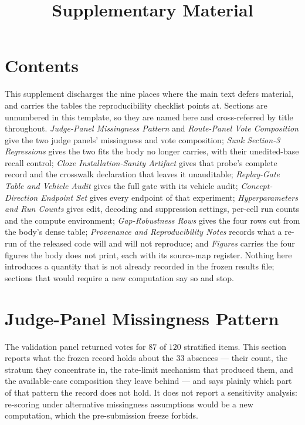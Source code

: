 \documentclass[letterpaper]{article}
\title{Supplementary Material}
\author{}
\begin{document}
\maketitle

\section*{Contents}
This supplement discharges the nine places where the main text defers material,
and carries the tables the reproducibility checklist points at.  Sections are
unnumbered in this template, so they are named here and cross-referred by title
throughout.  \emph{Judge-Panel Missingness Pattern} and \emph{Route-Panel Vote
Composition} give the two judge panels' missingness and vote composition;
\emph{Sunk Section-3 Regressions} gives the two fits the body no longer carries,
with their unedited-base recall control; \emph{Cloze Installation-Sanity
Artifact} gives that probe's complete record and the crosswalk declaration that
leaves it unauditable; \emph{Replay-Gate Table and Vehicle Audit} gives the full
gate with its vehicle audit; \emph{Concept-Direction Endpoint Set} gives every
endpoint of that experiment; \emph{Hyperparameters and Run Counts} gives edit,
decoding and suppression settings, per-cell run counts and the compute
environment; \emph{Gap-Robustness Rows} gives the four rows cut from the body's
dense table; \emph{Provenance and Reproducibility Notes} records what a re-run of
the released code will and will not reproduce; and \emph{Figures} carries the
four figures the body does not print, each with its source-map register.
Nothing here introduces a quantity that is not already recorded in the frozen
results file; sections that would require a new computation say so and stop.

\section{Judge-Panel Missingness Pattern}
The validation panel returned votes for \(87\) of \(120\) stratified items.  This
section reports what the frozen record holds about the \(33\) absences --- their
count, the stratum they concentrate in, the rate-limit mechanism that produced
them, and the available-case composition they leave behind --- and says plainly
which part of that pattern the record does not hold.  It does not report a
sensitivity analysis: re-scoring under alternative missingness assumptions would
be a new computation, which the pre-submission freeze forbids.
\end{document}
